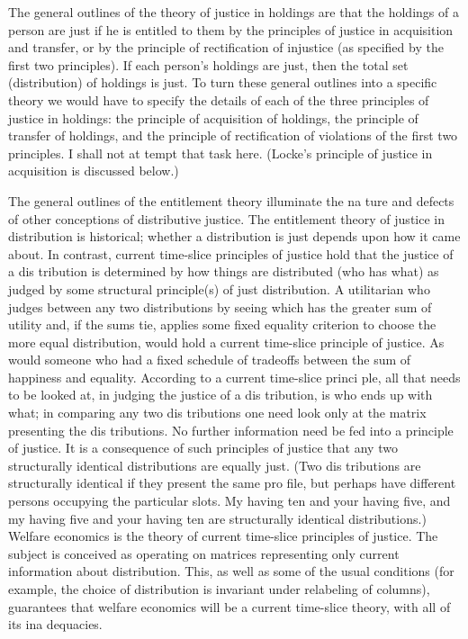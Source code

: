 \documentclass[11pt,openany]{book}
\begin{document}
The general outlines of the theory of justice in holdings are that the holdings of a person are just if he is entitled to them by the principles of justice in acquisition and transfer, or by the principle of rectification of injustice (as specified by the first two principles). If each person's holdings are just, then the total set (distribution) of holdings is just. To turn these general outlines into a specific theory we would have to specify the details of each of the three principles of justice in holdings: the principle of acquisition of holdings, the principle of transfer of holdings, and the principle of rectification of violations of the first two principles. I shall not at tempt that task here. (Locke's principle of justice in acquisition is discussed below.) 

The general outlines of the entitlement theory illuminate the na ture and defects of other conceptions of distributive justice. The entitlement theory of justice in distribution is historical; whether a distribution is just depends upon how it came about. In contrast, current time-slice principles of justice hold that the justice of a dis tribution is determined by how things are distributed (who has what) as judged by some structural principle(s) of just distribution. A utilitarian who judges between any two distributions by seeing which has the greater sum of utility and, if the sums tie, applies some fixed equality criterion to choose the more equal distribution, would hold a current time-slice principle of justice. As would someone who had a fixed schedule of tradeoffs between the sum of happiness and equality. According to a current time-slice princi ple, all that needs to be looked at, in judging the justice of a dis tribution, is who ends up with what; in comparing any two dis tributions one need look only at the matrix presenting the dis tributions. No further information need be fed into a principle of justice. It is a consequence of such principles of justice that any two structurally identical distributions are equally just. (Two dis tributions are structurally identical if they present the same pro file, but perhaps have different persons occupying the particular slots. My having ten and your having five, and my having five and your having ten are structurally identical distributions.) Welfare economics is the theory of current time-slice principles of justice. The subject is conceived as operating on matrices representing only current information about distribution. This, as well as some of the usual conditions (for example, the choice of distribution is invariant under relabeling of columns), guarantees that welfare economics will be a current time-slice theory, with all of its ina dequacies. 
\end{document}
